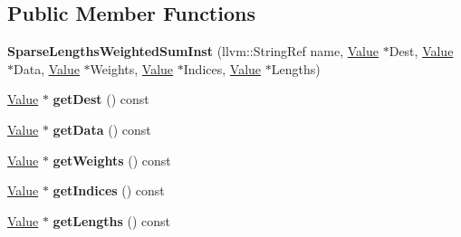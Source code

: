 \subsection*{Public Member Functions}
\begin{DoxyCompactItemize}
\item 
\mbox{\label{classglow_1_1_sparse_lengths_weighted_sum_inst_af5cc6a08080372e8cc0601b655827ef8}} 
{\bfseries Sparse\+Lengths\+Weighted\+Sum\+Inst} (llvm\+::\+String\+Ref name, \hyperlink{classglow_1_1_value}{Value} $\ast$Dest, \hyperlink{classglow_1_1_value}{Value} $\ast$Data, \hyperlink{classglow_1_1_value}{Value} $\ast$Weights, \hyperlink{classglow_1_1_value}{Value} $\ast$Indices, \hyperlink{classglow_1_1_value}{Value} $\ast$Lengths)
\item 
\mbox{\label{classglow_1_1_sparse_lengths_weighted_sum_inst_a643f3d7de5b08484e9d1f6d05b96aeb5}} 
\hyperlink{classglow_1_1_value}{Value} $\ast$ {\bfseries get\+Dest} () const
\item 
\mbox{\label{classglow_1_1_sparse_lengths_weighted_sum_inst_a61d3863f553316ed73c46ab19b3986f9}} 
\hyperlink{classglow_1_1_value}{Value} $\ast$ {\bfseries get\+Data} () const
\item 
\mbox{\label{classglow_1_1_sparse_lengths_weighted_sum_inst_a4b599fe9fde0d76ad4ff4d26e077e6f2}} 
\hyperlink{classglow_1_1_value}{Value} $\ast$ {\bfseries get\+Weights} () const
\item 
\mbox{\label{classglow_1_1_sparse_lengths_weighted_sum_inst_a037d4411b8cb3ad14ccac8a202042be8}} 
\hyperlink{classglow_1_1_value}{Value} $\ast$ {\bfseries get\+Indices} () const
\item 
\mbox{\label{classglow_1_1_sparse_lengths_weighted_sum_inst_a81a71ea16f7cb4c28dbf8d5fc9bd2ab8}} 
\hyperlink{classglow_1_1_value}{Value} $\ast$ {\bfseries get\+Lengths} () const
\item 
\mbox{\label{classglow_1_1_sparse_lengths_weighted_sum_inst_ae0c65f2130500ac73f6fc42df7aba01a}} 

\end{DoxyCompactItemize}
